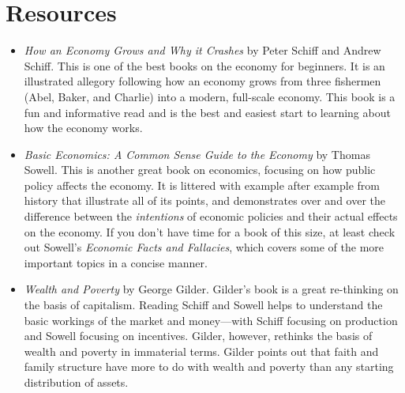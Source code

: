 \section{Resources}
\begin{itemize}
\item
\textit{How an Economy Grows and Why it Crashes} by Peter Schiff and Andrew Schiff.  
This is one of the best books on the economy for beginners.  It is an illustrated 
allegory following how an economy grows from three fishermen (Abel, Baker, and Charlie)
into a modern, full-scale economy.  This book is a fun and informative read and is 
the best and easiest start to learning about how the economy works.
\item 
\textit{Basic Economics: A Common Sense Guide to the Economy} by Thomas
Sowell.  This is another great book on economics, focusing on how public policy
affects the economy.  It is littered with example after example from history
that illustrate all of its points, and demonstrates over and over
the difference between the \textit{intentions} of economic policies and their
actual effects on the economy.  If you don't have time for a book of
this size, at least check out Sowell's
\textit{Economic Facts and Fallacies}, which covers some of the more
important topics in a concise manner.
\item
\textit{Wealth and Poverty} by George Gilder.  Gilder's book is a great 
re-thinking on the basis of capitalism.  Reading Schiff and Sowell 
helps to understand the basic workings of the market and
money---with Schiff focusing on production and Sowell focusing on incentives. 
Gilder, however, rethinks the basis of wealth and poverty in immaterial terms.
Gilder points out that faith and family structure have more to do with wealth and
poverty than any starting distribution of assets.
\end{itemize}
